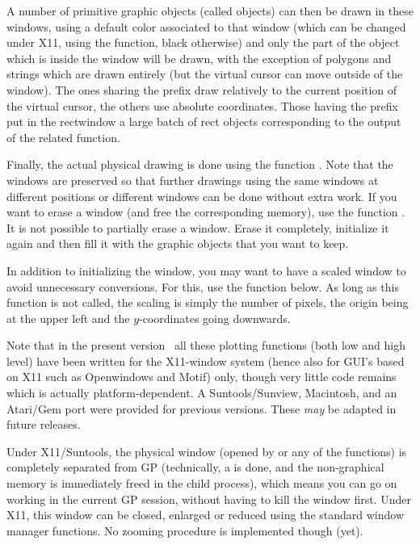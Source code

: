   A number of primitive graphic objects (called  objects) can then
be drawn in these windows, using a default color associated to that window
(which can be changed under X11, using the  function, black
otherwise) and only the part of the object which is inside the window will be
drawn, with the exception of polygons and strings which are drawn entirely
(but the virtual cursor can move outside of the window). The ones sharing the
prefix  draw relatively to the current position of the virtual
cursor, the others use absolute coordinates. Those having the prefix
 put in the rectwindow a large batch of rect objects
corresponding to the output of the related  function.

   Finally, the actual physical drawing is done using the function
. Note that the windows are preserved so that further drawings
using the same windows at different positions or different windows can be
done without extra work. If you want to erase a window (and free the
corresponding memory), use the function . It is not possible to
partially erase a window. Erase it completely, initialize it again and then
fill it with the graphic objects that you want to keep.

   In addition to initializing the window, you may want to have a scaled
window to avoid unnecessary conversions. For this, use the function
 below. As long as this function is not called, the scaling is
simply the number of pixels, the origin being at the upper left and the
$y$-coordinates going downwards.

   Note that in the present version \vers\ all these plotting functions
(both low and high level) have been written for the X11-window system
(hence also for GUI's based on X11 such as Openwindows and Motif) only,
though very little code remains which is actually platform-dependent. A
Suntools/Sunview, Macintosh, and an Atari/Gem port were provided for
previous versions. These \emph{may} be adapted in future releases.

   Under X11/Suntools, the physical window (opened by  or any
of the  functions) is completely separated from GP (technically,
a  is done, and the non-graphical memory is immediately freed in
the child process), which means you can go on working in the current GP
session, without having to kill the window first. Under X11, this window can
be closed, enlarged or reduced using the standard window manager functions.
No zooming procedure is implemented though (yet).

